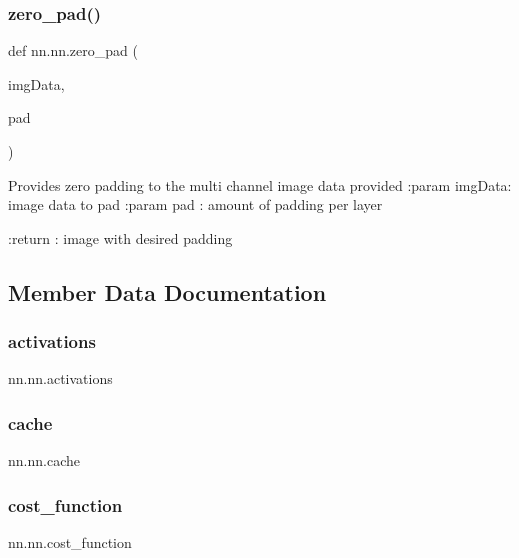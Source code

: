 \subsubsection{\texorpdfstring{zero\+\_\+pad()}{zero\_pad()}}
{\footnotesize\ttfamily def nn.\+nn.\+zero\+\_\+pad (\begin{DoxyParamCaption}\item[{}]{img\+Data,  }\item[{}]{pad }\end{DoxyParamCaption})\hspace{0.3cm}{\ttfamily [static]}}

\begin{DoxyVerb}Provides zero padding to the multi channel image data provided
:param imgData: image data to pad
:param pad    : amount of padding per layer

:return : image with desired padding
\end{DoxyVerb}
 

\subsection{Member Data Documentation}
\mbox{\label{classnn_1_1nn_acb7fb4cc0db120b007ef1ab1f82d7ba0}} 
\subsubsection{\texorpdfstring{activations}{activations}}
{\footnotesize\ttfamily nn.\+nn.\+activations}

\mbox{\label{classnn_1_1nn_a1f75a6242fc9ee82ca2632e18979b4d3}} 
\subsubsection{\texorpdfstring{cache}{cache}}
{\footnotesize\ttfamily nn.\+nn.\+cache}

\mbox{\label{classnn_1_1nn_adb4a96a154d03db3722022600e134c7f}} 
\subsubsection{\texorpdfstring{cost\+\_\+function}{cost\_function}}
{\footnotesize\ttfamily nn.\+nn.\+cost\+\_\+function}

